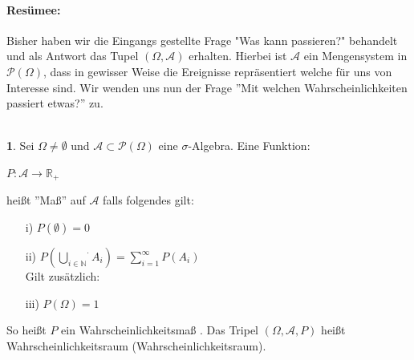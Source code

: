 \documentclass[10pt,a4paper]{report}
\numberwithin{equation}{section}
\numberwithin{figure}{section}
\theoremstyle{plain}
\theoremstyle{definition}
\newtheorem{defn}[thm]{\protect\definitionname}
\theoremstyle{remark}
\theoremstyle{plain}
\providecommand{\definitionname}{Definition}
\newcommand{\1}{ \mathbb{1} } %
\begin{document}
\paragraph{Resümee:}
\label{sec:resumee}
Bisher haben wir die Eingangs gestellte Frage "Was kann passieren?" behandelt und als Antwort das Tupel $(\Omega,\mathcal{A})$ erhalten. Hierbei ist $\mathcal{A}$ ein Mengensystem in $\mathcal{P}(\Omega)$, dass in gewisser Weise die Ereignisse repräsentiert welche für uns von Interesse sind. Wir wenden uns nun der Frage ''Mit welchen Wahrscheinlichkeiten passiert etwas?'' zu.\\\\
\begin{defn}  %
  Sei $\Omega \neq \emptyset$ und $\mathcal{A}\subset
  \mathcal{P}(\Omega)$ eine $\sigma$-Algebra. Eine
  Funktion:\begin{center} $P: \mathcal{A} \rightarrow \mathbb{R}_+$
  \end{center}
  heißt ''Maß'' auf $\mathcal{A}$ falls folgendes gilt:
  \begin{itemize}
  \item[i)] $P(\emptyset)=0$
  \item[ii)] $P\left(\stackrel{\cdot}{\bigcup\limits_{i \in \mathbb{N}}}A_i\right)=\sum\limits_{i=1}^\infty P(A_i)$\\
    Gilt zusätzlich:
  \item[iii)] $P(\Omega)=1$
  \end{itemize}
  So heißt $P$ ein Wahrscheinlichkeitsmaß .
  Das Tripel $(\Omega,\mathcal{A},P)$ heißt Wahrscheinlichkeitsraum (Wahrscheinlichkeitsraum). 
\end{defn}
\end{document}
